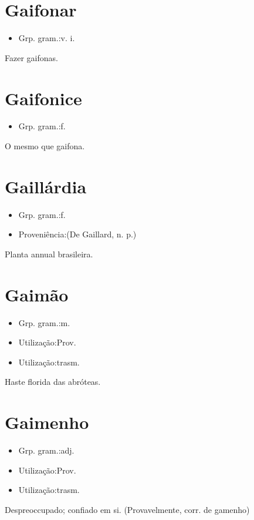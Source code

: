 \section{Gaifonar}
\begin{itemize}
\item {Grp. gram.:v. i.}
\end{itemize}
Fazer gaifonas.
\section{Gaifonice}
\begin{itemize}
\item {Grp. gram.:f.}
\end{itemize}
O mesmo que \textunderscore gaifona\textunderscore .
\section{Gaillárdia}
\begin{itemize}
\item {Grp. gram.:f.}
\end{itemize}
\begin{itemize}
\item {Proveniência:(De \textunderscore Gaillard\textunderscore , n. p.)}
\end{itemize}
Planta annual brasileira.
\section{Gaimão}
\begin{itemize}
\item {Grp. gram.:m.}
\end{itemize}
\begin{itemize}
\item {Utilização:Prov.}
\end{itemize}
\begin{itemize}
\item {Utilização:trasm.}
\end{itemize}
Haste florida das abróteas.
\section{Gaimenho}
\begin{itemize}
\item {Grp. gram.:adj.}
\end{itemize}
\begin{itemize}
\item {Utilização:Prov.}
\end{itemize}
\begin{itemize}
\item {Utilização:trasm.}
\end{itemize}
Despreoccupado; confiado em si.
(Provavelmente, corr. de \textunderscore gamenho\textunderscore )
